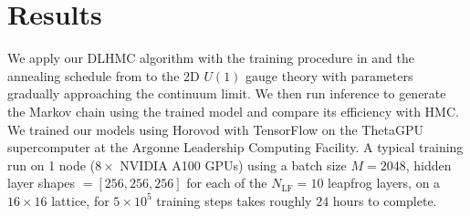 \documentclass{article} %
\begin{document}
\section{\label{sec:results}Results}
%
We apply our DLHMC algorithm with
the training procedure in  and the annealing schedule from 
to the 2D $U(1)$ gauge theory with parameters gradually approaching the continuum limit.
We then run inference to generate the Markov chain using the trained model and compare its efficiency with HMC.\@
%
%
We trained our models using Horovod \citep{horovod2018sergeev} with TensorFlow \citep{tensorflow2015-whitepaper} on the ThetaGPU supercomputer at the Argonne Leadership Computing Facility.
%
%
A typical training run on 1 node (\(8\times\) NVIDIA A100 GPUs) using a batch size \(M=2048\), hidden layer shapes \(=\left[256, 256, 256\right]\) for each of the \(N_{\mathrm{LF}}=10\) leapfrog layers, on a \(16\times16\) lattice, for \(5\times10^{5}\) training steps takes roughly \(24\) hours to complete.
%
%

%

%
\end{document}
